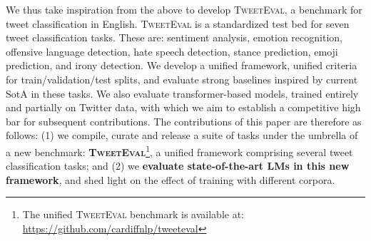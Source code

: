 \documentclass[11pt,a4paper]{article}
\begin{document}
We thus take inspiration from the above to develop \textsc{TweetEval}, a benchmark for tweet classification in English. \textsc{TweetEval} is a standardized test bed for seven tweet classification tasks. These are: sentiment analysis, emotion recognition, offensive language detection, hate speech detection, stance prediction, emoji prediction, and irony detection. We develop a unified framework, unified criteria for train/validation/test splits, and evaluate strong baselines inspired by current SotA in these tasks. We also evaluate transformer-based models, trained entirely and partially on Twitter data, with which we aim to establish a competitive high bar for subsequent contributions. The contributions of this paper are therefore as follows: (1) we compile, curate and release a suite of tasks under the umbrella of a new benchmark: \textbf{\textsc{TweetEval}}\footnote{The unified \textsc{TweetEval} benchmark is available at:\\\scriptsize \url{https://github.com/cardiffnlp/tweeteval}}, a unified framework comprising several tweet classification tasks; and (2) we \textbf{evaluate state-of-the-art LMs in this new framework}, and shed light on the effect of training with different corpora.
\end{document}
